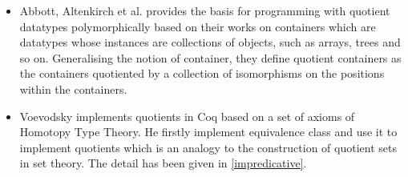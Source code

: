 \begin{itemize}
\item Abbott, Altenkirch et al. \cite{abb:04} provides the basis for
programming with quotient datatypes polymorphically based on their
works on containers which are datatypes whose instances are
collections of objects, such as arrays, trees and so on. Generalising
the notion of container, they define quotient containers as the
containers quotiented by a collection of isomorphisms on the positions
within the containers.

\item Voevodsky \cite{voe:hset} implements quotients in Coq based on a set
of axioms of Homotopy Type Theory. He firstly implement
equivalence class and use it to implement quotients which is an
analogy to the construction of quotient sets in set theory. The detail has been given in \autoref{impredicative}.


\end{itemize}



